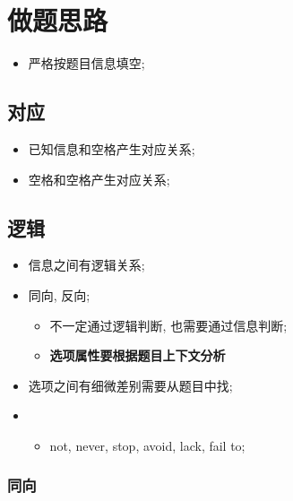 \chapter{做题思路}

\begin{itemize}
  \item 严格按题目信息填空;
\end{itemize}

\section{对应}

  \begin{itemize}
    \item 已知信息和空格产生对应关系;
    \item 空格和空格产生对应关系;
  \end{itemize}

\section{逻辑}

  \begin{itemize}
    \item 信息之间有逻辑关系;
    \item 同向, 反向;
    \begin{itemize}
      \item 不一定通过逻辑判断, 也需要通过信息判断;
      \item \textbf{选项属性要根据题目上下文分析}
    \end{itemize}

    \item 选项之间有细微差别需要从题目中找;
    \item {}
    \begin{itemize}
      \item not, never, stop, avoid, lack, fail to;
    \end{itemize}
  \end{itemize}

  \subsection{同向}

